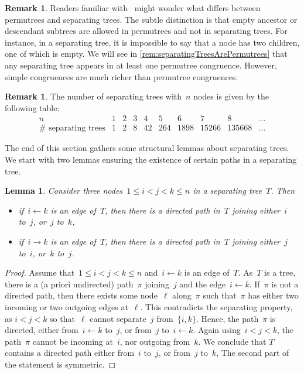 \documentclass{amsart}
\newtheorem{lemma}[theorem]{Lemma}
\theoremstyle{definition}
\newtheorem{remark}[theorem]{Remark}
\begin{document}
\begin{remark}
\label{rem:separatingTreesVSPermutrees}
Readers familiar with~\cite{PilaudPons-permutrees} might wonder what differs between permutrees and separating trees.
The subtle distinction is that empty ancestor or descendant subtrees are allowed in permutrees and not in separating trees.
For instance, in a separating tree, it is impossible to say that a node has two children, one of which is empty.
We will see in \cref{rem:separatingTreesArePermutrees} that any separating tree appears in at least one permutree congruence.
However, simple congruences are much richer than permutree congruences.
\end{remark}

\begin{remark}
The number of separating trees with~$n$ nodes is given by the following table:
\[
\begin{array}{c|ccccccccc}
n & 1 & 2 & 3 & 4 & 5 & 6 & 7 & 8 & \dots \\
\hline
\#\text{ separating trees} & 1 & 2 & 8 & 42 & 264 & 1898 & 15266 & 135668 & \dots
\end{array}
\]
\end{remark}

The end of this section gathers some structural lemmas about separating trees.
We start with two lemmas ensuring the existence of certain paths in a separating tree.

\begin{lemma}
\label{lem:separatingTree1}
Consider three nodes~$1 \le i < j < k \le n$ in a separating tree~$T$. Then
\begin{itemize}
\item if~$i \leftarrow k$ is an edge of~$T$, then there is a directed path in~$T$ joining either~$i$ to~$j$, or~$j$ to~$k$,
\item if~$i \to k$ is an edge of~$T$, then there is a directed path in~$T$ joining either~$j$ to~$i$, or~$k$ to~$j$.
\end{itemize}
\end{lemma}

\begin{proof}
Assume that~$1 \le i < j < k \le n$ and~$i \leftarrow k$ is an edge of~$T$.
As~$T$ is a tree, there is a (a priori undirected) path~$\pi$ joining~$j$ and the edge~$i \leftarrow k$.
If~$\pi$ is not a directed path, then there exists some node~$\ell$ along~$\pi$ such that~$\pi$ has either two incoming or two outgoing edges at~$\ell$.
This contradicts the separating property, as $i < j < k$ so that~$\ell$ cannot separate~$j$ from~$\{i,k\}$.
Hence, the path~$\pi$ is directed, either from~$i \leftarrow k$ to~$j$, or from~$j$ to~$i \leftarrow k$.
Again using~$i < j < k$, the path~$\pi$ cannot be incoming at~$i$, nor outgoing from~$k$.
We conclude that $T$ contains a directed path either from~$i$ to~$j$, or from~$j$ to~$k$,
The second part of the statement is symmetric.
\end{proof}
\end{document}
